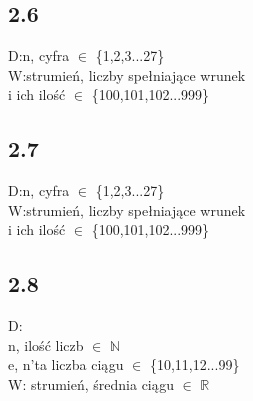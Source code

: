 \documentclass[a4paper,twoside,7pt]{book}
\begin{document}
\subsection*{2.6}
\begin{multicols}{2}
  \begin{flushleft}

    \end{flushleft}
D:n, cyfra $\in$ \{1,2,3...27\}\\
W:strumień, liczby spełniające wrunek\\
i ich ilość $\in$ \{100,101,102...999\}
\begin{flushright}


    
\end{flushright} 
\end{multicols}

\subsection*{2.7}
\begin{multicols}{2}
  \begin{flushleft}

    \end{flushleft}
D:n, cyfra $\in$ \{1,2,3...27\}\\
W:strumień, liczby spełniające wrunek\\
i ich ilość $\in$ \{100,101,102...999\}
    \begin{flushright}
    
    \end{flushright}    
\end{multicols}

\subsection*{2.8}
\begin{multicols}{2}
  \begin{flushleft}

    \end{flushleft}
D: \\
n, ilość liczb $\in$ $\mathbb{N}$\\
e, n'ta liczba ciągu $\in$ \{10,11,12...99\}\\
W: strumień, średnia ciągu $\in$ $\mathbb{R}$
    \begin{flushright}
    
    \end{flushright}    
\end{multicols}
\end{document}
